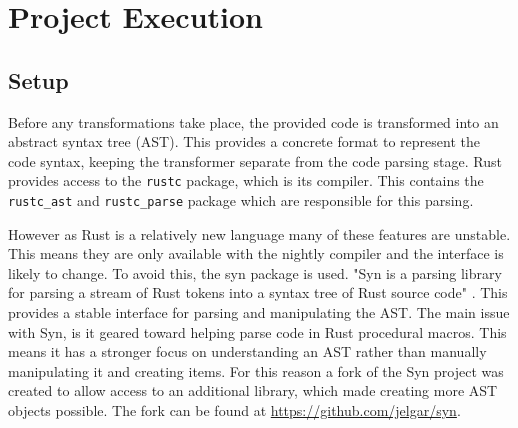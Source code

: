 \documentclass[ oneside,%
                    author={James Elgar},
                    degree={MEng},
                     title={Bidirectional transformer between functional and \\ object-oriented programming in Rust},
                  subtitle={}]{dissertation}
\begin{document}




\chapter{Project Execution}
\label{chap:execution}

\section{Setup}

Before any transformations take place, the provided code is transformed into an abstract syntax tree (AST). This provides a concrete format to represent the code syntax, keeping the transformer separate from the code parsing stage. Rust provides access to the \verb|rustc| package, which is its compiler. This contains the \verb|rustc_ast| and \verb|rustc_parse| package which are responsible for this parsing.

However as Rust is a relatively new language many of these features are unstable. This means they are only available with the nightly compiler and the interface is likely to change. To avoid this, the syn package is used. "Syn is a parsing library for parsing a stream of Rust tokens into a syntax tree of Rust source code" \cite{syn}. This provides a stable interface for parsing and manipulating the AST.
The main issue with Syn, is it geared toward helping parse code in Rust procedural macros. This means it has a stronger focus on understanding an AST rather than manually manipulating it and creating items. For this reason a fork of the Syn project was created to allow access to an additional library, which made creating more AST objects possible. The fork can be found at \url{https://github.com/jelgar/syn}.
\end{document}
